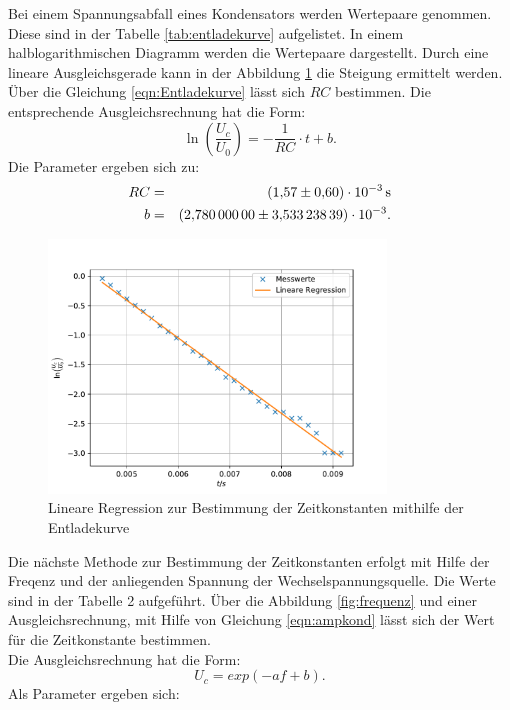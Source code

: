 Bei einem Spannungsabfall eines Kondensators werden Wertepaare genommen.
Diese sind in der Tabelle \ref{tab:entladekurve} aufgelistet.
In einem halblogarithmischen Diagramm werden die Wertepaare dargestellt.
Durch eine lineare Ausgleichsgerade kann in der Abbildung \ref{fig:entladekurve} die Steigung ermittelt werden.
Über die Gleichung \eqref{eqn:Entladekurve} lässt sich $RC$ bestimmen.
Die entsprechende Ausgleichsrechnung hat die Form:
\begin{equation*}
  \ln{ \left( \frac{U_c}{U_0} \right)}=-\frac{1}{RC}\cdot t+b.
\end{equation*}
Die Parameter ergeben sich zu:
\begin{align*}
  RC &=& \SI{1.57\pm 0.60e-3}{s}\\
  b  &=& \SI{2.78 \pm 3.53323839e-03}{}.\\
\end{align*}

\begin{figure}[h!]
  \centering
  \includegraphics[width=0.8\textwidth]{Zeit.pdf}
  \caption{Lineare Regression zur Bestimmung der Zeitkonstanten mithilfe der Entladekurve}
  \label{fig:entladekurve}
\end{figure}
%
%
Die nächste Methode zur Bestimmung der Zeitkonstanten erfolgt mit Hilfe der Freqenz und der anliegenden Spannung der Wechselspannungsquelle. Die Werte sind in der Tabelle 2 aufgeführt.
Über die Abbildung \ref{fig:frequenz} und einer Ausgleichsrechnung, mit Hilfe von Gleichung \eqref{eqn:ampkond} lässt sich der Wert für die Zeitkonstante bestimmen.\\
Die Ausgleichsrechnung hat die Form:
\begin{equation*}
    U_{c}=exp(-af+b).
\end{equation*}
Als Parameter ergeben sich:
